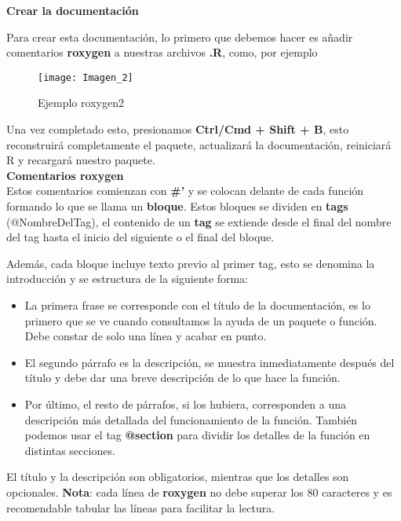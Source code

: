 \textbf{Crear la documentaci\'on}

Para crear esta documentaci\'on, lo primero que debemos hacer es a\~nadir comentarios
\textbf{roxygen} a nuestras archivos \textbf{.R}, como, por ejemplo

\begin{figure}[H]
    \centering
    \texttt{[image: Imagen\_2]}
    \caption{Ejemplo roxygen2   }
    \label{fig:roxygen2}
\end{figure} 

Una vez completado esto, presionamos \textbf{Ctrl/Cmd + Shift + B}, esto reconstruir\'a
completamente el paquete, actualizar\'a la documentaci\'on, reiniciar\'a R y recargar\'a nuestro
paquete. \\

\textbf{Comentarios roxygen} \\
Estos comentarios comienzan con \textbf{\#'} y se colocan delante de cada funci\'on formando lo que
se llama un \textbf{bloque}. Estos bloques se dividen en \textbf{tags} (@NombreDelTag), el contenido de un
\textbf{tag} se extiende desde el final del nombre del tag hasta el inicio del siguiente o el final del
bloque.

Adem\'as, cada bloque incluye texto previo al primer tag, esto se denomina la introducci\'on y
se estructura de la siguiente forma:

\begin{itemize}
    \item La primera frase se corresponde con el t\'itulo de la documentaci\'on, es lo primero que
se ve cuando consultamos la ayuda de un paquete o funci\'on. Debe constar de solo
una l\'inea y acabar en punto.
    \item El segundo p\'arrafo es la descripci\'on, se muestra inmediatamente despu\'es del t\'itulo y
debe dar una breve descripci\'on de lo que hace la funci\'on.
    \item Por \'ultimo, el resto de p\'arrafos, si los hubiera, corresponden a una descripci\'on m\'as
detallada del funcionamiento de la funci\'on. Tambi\'en podemos usar el tag \textbf{@section}
para dividir los detalles de la funci\'on en distintas secciones.
\end{itemize}

El t\'itulo y la descripci\'on son obligatorios, mientras que los detalles son opcionales.
\textbf{Nota}: cada l\'inea de \textbf{roxygen} no debe superar los 80 caracteres y es recomendable tabular
las l\'ineas para facilitar la lectura.\\

